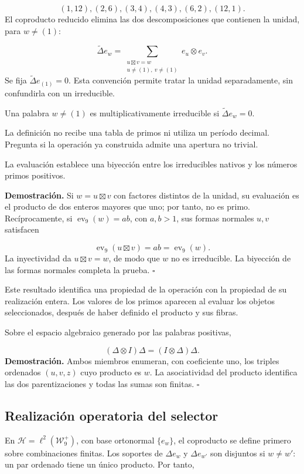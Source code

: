 \[
(1,12),(2,6),(3,4),(4,3),(6,2),(12,1).
\]
El coproducto reducido elimina las dos descomposiciones que contienen la unidad, para $w\ne(1)$:

\[
\widetilde\Delta e_w
=\sum_{\substack{u\boxtimes v=w\\u\ne(1),\ v\ne(1)}}e_u\otimes e_v.
\]
Se fija $\widetilde\Delta e_{(1)}=0$. Esta convención permite tratar la unidad separadamente, sin confundirla con un irreducible.

Una palabra $w\ne(1)$ es multiplicativamente irreducible si $\widetilde\Delta e_w=0$.

La definición no recibe una tabla de primos ni utiliza un período decimal. Pregunta si la operación ya construida admite una apertura no trivial.

La evaluación establece una biyección entre los irreducibles nativos y los números primos positivos.

\textbf{Demostración.} Si $w=u\boxtimes v$ con factores distintos de la unidad, su evaluación es el producto de dos enteros mayores que uno; por tanto, no es primo. Recíprocamente, si $\operatorname{ev}_9(w)=ab$, con $a,b>1$, sus formas normales $u,v$ satisfacen

\[
\operatorname{ev}_9(u\boxtimes v)=ab=\operatorname{ev}_9(w).
\]
La inyectividad da $u\boxtimes v=w$, de modo que $w$ no es irreducible. La biyección de las formas normales completa la prueba. \hfill\(\square\)

Este resultado identifica una propiedad de la operación con la propiedad de su realización entera. Los valores de los primos aparecen al evaluar los objetos seleccionados, después de haber definido el producto y sus fibras.

Sobre el espacio algebraico generado por las palabras positivas,

\[
(\Delta\otimes I)\Delta=(I\otimes\Delta)\Delta.
\]
\textbf{Demostración.} Ambos miembros enumeran, con coeficiente uno, los triples ordenados $(u,v,z)$ cuyo producto es $w$. La asociatividad del producto identifica las dos parentizaciones y todas las sumas son finitas. \hfill\(\square\)

\subsection{Realización operatoria del selector}
En \(\mathcal H=\ell^2(\mathcal W_9^+)\), con base ortonormal \(\{e_w\}\), el coproducto se define primero sobre combinaciones finitas. Los soportes de $\Delta e_w$ y $\Delta e_{w'}$ son disjuntos si $w\ne w'$: un par ordenado tiene un único producto. Por tanto,

